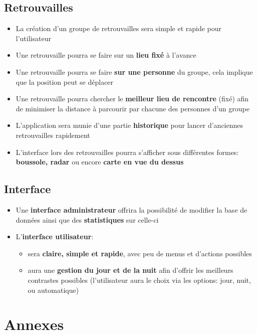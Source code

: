 \documentclass[french]{article}
\begin{document}
		\subsection{Retrouvailles}
			\begin{itemize}
				\item La création d'un groupe de retrouvailles sera simple et rapide pour l'utilisateur
				\item Une retrouvaille pourra se faire sur un \textbf{lieu fixé} à l'avance 
				\item Une retrouvaille pourra se faire \textbf{sur une personne} du groupe, cela implique que la position peut se déplacer
				\item Une retrouvaille pourra chercher le \textbf{meilleur lieu de rencontre} (fixé) afin de minimiser la distance à parcourir par chacune des personnes d'un groupe
				\item L'application sera munie d'une partie \textbf{historique} pour lancer d'anciennes retrouvailles rapidement 
				\item L'interface lors des retrouvailles pourra s'afficher sous différentes formes: \textbf{boussole, radar} ou encore \textbf{carte en vue du dessus}
			\end{itemize}
			
		\subsection{Interface}
			\begin{itemize}
				\item Une \textbf{interface administrateur} offrira la possibilité de modifier la base de données ainsi que des \textbf{statistiques} sur celle-ci
				\item L'\textbf{interface utilisateur}:
				\begin{itemize}
					\item sera \textbf{claire, simple et rapide}, avec peu de menus et d'actions possibles
					\item aura une \textbf{gestion du jour et de la nuit} afin d'offrir les meilleurs contrastes possibles (l'utilisateur aura le choix via les options: jour, nuit, ou automatique)
				\end{itemize}
			\end{itemize}
		
	\section{Annexes}
\end{document}
